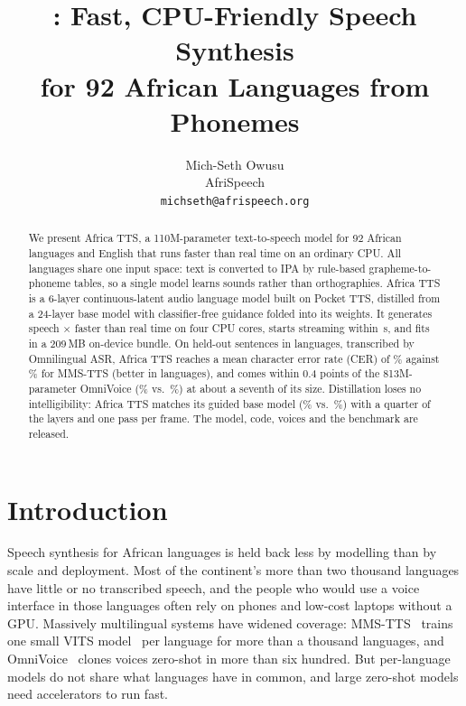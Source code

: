 \documentclass[10pt,twocolumn]{article}
\title{\att{}: Fast, CPU-Friendly Speech Synthesis\\for 92 African Languages from Phonemes}
\author{%
Mich-Seth Owusu\\[2pt]
\normalsize AfriSpeech\\
\normalsize\texttt{michseth@afrispeech.org}
}
\date{}
\newcommand{\att}{Africa TTS}
\begin{document}
\maketitle

\begin{abstract}
We present \att{}, a 110M-parameter text-to-speech model for 92 African languages and English
that runs faster than real time on an ordinary CPU. All languages share one input space: text is
converted to IPA by rule-based grapheme-to-phoneme tables, so a single model learns sounds rather
than orthographies. \att{} is a 6-layer continuous-latent audio language model built on Pocket
TTS, distilled from a 24-layer base model with classifier-free guidance folded into its weights.
It generates speech \xrtturbopython{}$\times$ faster than real time on four CPU cores, starts
streaming within \ttfaturbopython{}\,s, and fits in a 209\,MB on-device bundle. On held-out
sentences in \nTrainedLangs{} languages, transcribed by Omnilingual ASR, \att{} reaches a mean
character error rate (CER) of \avgMmsturbo{}\% against \avgMmsMms{}\% for MMS-TTS (better in
\turboBeatsMms{} languages), and comes within 0.4 points of the 813M-parameter OmniVoice
(\avgOmniturbo{}\% vs.\ \avgOmniOmni{}\%) at about a seventh of its size. Distillation loses no
intelligibility: \att{} matches its guided base model (\distturbo{}\% vs.\ \distguided{}\%) with
a quarter of the layers and one pass per frame. The model, code, voices and the benchmark are
released.
\end{abstract}

\section{Introduction}

Speech synthesis for African languages is held back less by modelling than by scale and
deployment. Most of the continent's more than two thousand languages have little or no
transcribed speech, and the people who would use a voice interface in those languages often
rely on phones and low-cost laptops without a GPU. Massively multilingual systems have widened
coverage: MMS-TTS~\cite{pratap2023mms} trains one small VITS model~\cite{kim2021vits} per
language for more than a thousand languages, and OmniVoice~\cite{zhu2026omnivoice} clones voices
zero-shot in more than six hundred. But per-language models do not share what languages have in
common, and large zero-shot models need accelerators to run fast.
\end{document}
